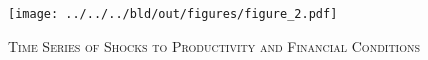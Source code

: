 \begin{figure}[t]
    \begin{center}
	    \texttt{[image: ../../../bld/out/figures/figure\_2.pdf]}
    	\caption{\textsc{Time Series of Shocks to Productivity and Financial Conditions}}
	    \label{fig:figure_2}
    \end{center}
\end{figure}

